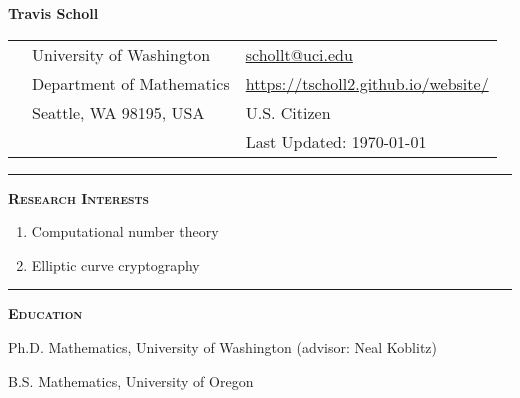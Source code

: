 \documentclass[12pt]{article}
\newcommand{\sectionheading}[1]
{
\bigskip %
\noindent
\hspace{-6.5mm}\textcolor{Gray}{\rule[.75mm]{21.5mm}{1mm}} %
\hspace{.2mm}	%
{\large{\textbf{\textsc{#1}}}} %
}
\newenvironment{date_section}
	{
	\vspace{-1ex}
	\leftmargini = 15ex
		\begin{itemize}[
			labelsep = *,
			labelwidth = 9ex,
			labelindent = 0ex,
			itemindent = !,
			font=\normalfont,
			align=parleft
		]{}
		\itemsep=-1.5mm
	}
	{\end{itemize}\vspace{-2ex}}
\newcommand{\yearmo}[2]{
	\item[
		{\makebox[1ex][r]{#1}}
		\hspace{1ex}
		{\makebox[1ex][l]{#2} }
		] }
\begin{document}

	\thispagestyle{empty}

	\centerline{{\LARGE \textbf{Travis Scholl}}}

	\vspace{3mm}

	\begin{center}
		\begin{tabular}[c]{lll} %
			\phantom{aaaaaaaaa} %
			& University of Washington
				& \url{schollt@uci.edu} \\
 			& Department of Mathematics
				& \url{https://tscholl2.github.io/website/}\\
 			& Seattle, WA 98195, USA
	 			& U.S. Citizen \\
			&
				& Last Updated: \today
		\end{tabular}
	\end{center}

	\sectionheading{Research Interests}%

	\vspace{1ex}

	\begin{enumerate}[label=$\bullet$, itemsep=-1mm, leftmargin=24mm]
		\item Computational number theory
		\item Elliptic curve cryptography
	\end{enumerate}

	\sectionheading{Education}%

		\begin{date_section}

			\yearmo{}{2018} Ph.D. Mathematics, University of Washington (advisor: Neal Koblitz)

			\yearmo{}{2013} %
			B.S. Mathematics, University of Oregon





		\end{date_section}
\end{document}
